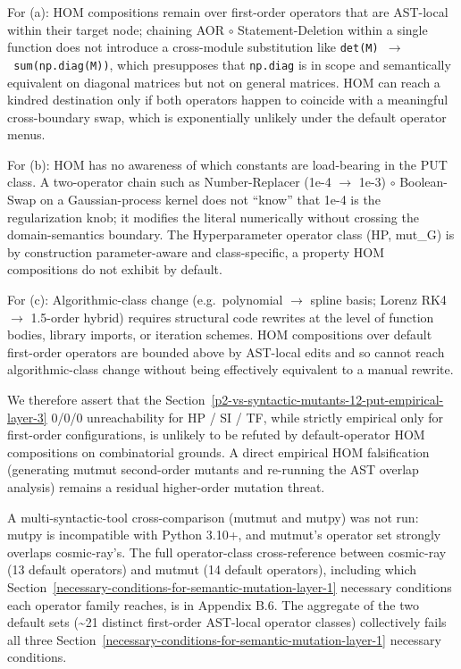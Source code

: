 \documentclass[manuscript,screen,review]{acmart}
\begin{document}
For (a): HOM compositions remain over first-order operators that are
AST-local within their target node; chaining AOR $\circ$ Statement-Deletion
within a single function does not introduce a cross-module substitution
like \texttt{det(M)\ $\to$\ sum(np.diag(M))}, which presupposes that
\texttt{np.diag} is in scope and semantically equivalent on diagonal
matrices but not on general matrices. HOM can reach a kindred
destination only if both operators happen to coincide with a meaningful
cross-boundary swap, which is exponentially unlikely under the default
operator menus.

For (b): HOM has no awareness of which constants are load-bearing in the
PUT class. A two-operator chain such as Number-Replacer (1e-4 $\to$ 1e-3) $\circ$
Boolean-Swap on a Gaussian-process kernel does not ``know'' that 1e-4 is
the regularization knob; it modifies the literal numerically without
crossing the domain-semantics boundary. The Hyperparameter operator
class (HP, mut\_G) is by construction parameter-aware and
class-specific, a property HOM compositions do not exhibit by default.

For (c): Algorithmic-class change (e.g.~polynomial $\to$ spline basis;
Lorenz RK4 $\to$ 1.5-order hybrid) requires structural code rewrites at the
level of function bodies, library imports, or iteration schemes. HOM
compositions over default first-order operators are bounded above by
AST-local edits and so cannot reach algorithmic-class change without
being effectively equivalent to a manual rewrite.

We therefore assert that the Section~\ref{p2-vs-syntactic-mutants-12-put-empirical-layer-3} 0/0/0 unreachability for HP / SI / TF,
while strictly empirical only for first-order configurations, is
unlikely to be refuted by default-operator HOM compositions on
combinatorial grounds. A direct empirical HOM falsification (generating
mutmut second-order mutants and re-running the AST overlap analysis)
remains a residual higher-order mutation threat.

A multi-syntactic-tool cross-comparison (mutmut and mutpy) was not run:
mutpy is incompatible with Python 3.10+, and mutmut's operator
set strongly overlaps cosmic-ray's. The full operator-class
cross-reference between cosmic-ray (13 default operators) and mutmut (14
default operators), including which Section~\ref{necessary-conditions-for-semantic-mutation-layer-1} necessary conditions each
operator family reaches, is in Appendix B.6. The aggregate of the two
default sets (\textasciitilde21 distinct first-order AST-local operator
classes) collectively fails all three Section~\ref{necessary-conditions-for-semantic-mutation-layer-1} necessary conditions.
\end{document}
